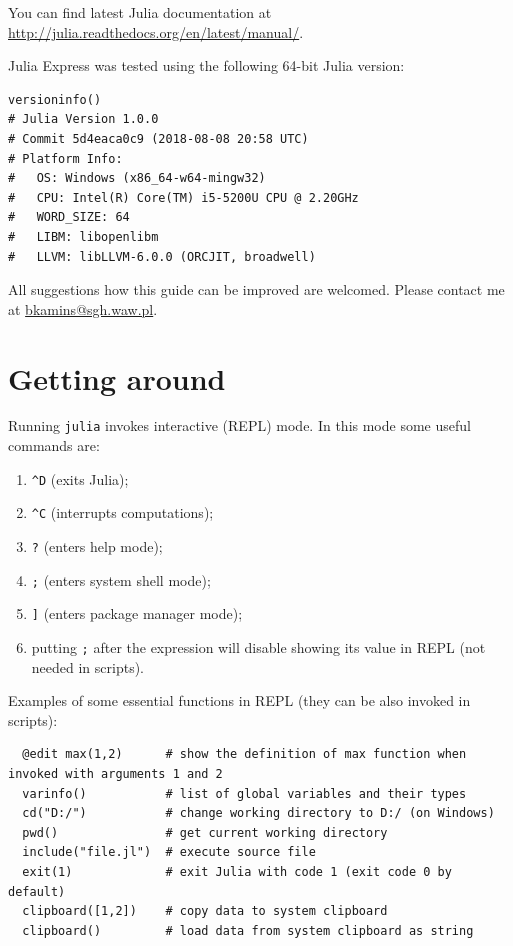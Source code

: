 \documentclass[10pt,a4paper]{article}
\begin{document}
You can find latest Julia documentation at \url{http://julia.readthedocs.org/en/latest/manual/}.

Julia Express was tested using the following 64-bit Julia version:
\begin{lstlisting}
versioninfo()
# Julia Version 1.0.0
# Commit 5d4eaca0c9 (2018-08-08 20:58 UTC)
# Platform Info:
#   OS: Windows (x86_64-w64-mingw32)
#   CPU: Intel(R) Core(TM) i5-5200U CPU @ 2.20GHz
#   WORD_SIZE: 64
#   LIBM: libopenlibm
#   LLVM: libLLVM-6.0.0 (ORCJIT, broadwell)
\end{lstlisting}

All suggestions how this guide can be improved are welcomed. Please contact me at \href{mailto:bkamins@sgh.waw.pl}{bkamins@sgh.waw.pl}.

\section{Getting around}

Running \lstinline|julia| invokes interactive (REPL) mode. In this mode some useful commands are:
\begin{enumerate}[label=\arabic*),nolistsep]
  \item \lstinline|^D| (exits Julia);
  \item \lstinline|^C| (interrupts computations);
  \item \lstinline|?| (enters help mode);
  \item \lstinline|;| (enters system shell mode);
  \item \lstinline|]| (enters package manager mode);
  \item putting \lstinline|;| after the expression will disable showing its value in REPL (not needed in scripts).
\end{enumerate}

Examples of some essential functions in REPL (they can be also invoked in scripts):
\begin{lstlisting}
  @edit max(1,2)      # show the definition of max function when invoked with arguments 1 and 2
  varinfo()           # list of global variables and their types
  cd("D:/")           # change working directory to D:/ (on Windows)
  pwd()               # get current working directory
  include("file.jl")  # execute source file
  exit(1)             # exit Julia with code 1 (exit code 0 by default)
  clipboard([1,2])    # copy data to system clipboard
  clipboard()         # load data from system clipboard as string
\end{lstlisting}
\end{document}
